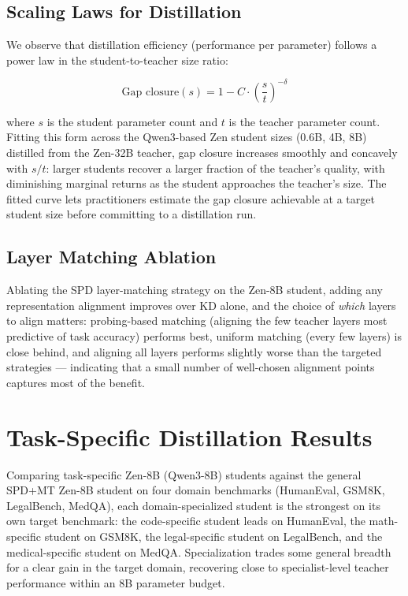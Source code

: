 \documentclass[11pt,a4paper]{article}
\begin{document}
\subsection{Scaling Laws for Distillation}

We observe that distillation efficiency (performance per parameter) follows a power law
in the student-to-teacher size ratio:

\begin{equation}
    \text{Gap closure}(s) = 1 - C \cdot \left(\frac{s}{t}\right)^{-\delta}
    \label{eq:scaling}
\end{equation}

where $s$ is the student parameter count and $t$ is the teacher parameter count. Fitting
this form across the Qwen3-based Zen student sizes (0.6B, 4B, 8B) distilled from the
Zen-32B teacher, gap closure increases smoothly and concavely with $s/t$: larger students
recover a larger fraction of the teacher's quality, with diminishing marginal returns as
the student approaches the teacher's size. The fitted curve lets practitioners estimate
the gap closure achievable at a target student size before committing to a distillation
run.

\subsection{Layer Matching Ablation}

Ablating the SPD layer-matching strategy on the Zen-8B student, adding any representation
alignment improves over KD alone, and the choice of \emph{which} layers to align matters:
probing-based matching (aligning the few teacher layers most predictive of task accuracy)
performs best, uniform matching (every few layers) is close behind, and aligning all
layers performs slightly worse than the targeted strategies — indicating that a small
number of well-chosen alignment points captures most of the benefit.

\section{Task-Specific Distillation Results}
\label{sec:task_specific}

Comparing task-specific Zen-8B (Qwen3-8B) students against the general SPD+MT Zen-8B
student on four domain benchmarks (HumanEval, GSM8K, LegalBench, MedQA), each
domain-specialized student is the strongest on its own target benchmark: the code-specific
student leads on HumanEval, the math-specific student on GSM8K, the legal-specific student
on LegalBench, and the medical-specific student on MedQA. Specialization trades some
general breadth for a clear gain in the target domain, recovering close to specialist-level
teacher performance within an 8B parameter budget.
\end{document}

